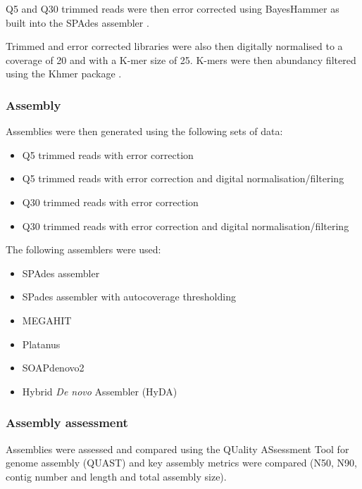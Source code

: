 Q5 and Q30 trimmed reads were then error corrected using BayesHammer
\citep{Nikolenko2013} as built into the SPAdes assembler \citep{Bankevich2012}.

Trimmed and error corrected libraries were also then digitally normalised
\citep{Brown2012} to a coverage of 20 and with a K-mer size of 25.
K-mers were then abundancy filtered \citep{Zhang2014,Zhang2015}
using the Khmer package \citep{Crusoe2015}.

\subsubsection{Assembly}

Assemblies were then generated using the following sets
of data:
\begin{itemize}
    \item Q5 trimmed reads with error correction
    \item Q5 trimmed reads with error correction and digital normalisation/filtering
    \item Q30 trimmed reads with error correction
    \item Q30 trimmed reads with error correction and digital normalisation/filtering
\end{itemize}

The following assemblers were used:
\begin{itemize}
    \item SPAdes assembler \citep{Bankevich2012,Nurk2013}
    \item SPades assembler with autocoverage thresholding 
    \item MEGAHIT \citep{Li2015a}
    \item Platanus \citep{Kajitani2014}
    \item SOAPdenovo2 \citep{Luo2012}
    \item Hybrid \textit{De novo} Assembler (HyDA) \citep{Movahedi2014}
\end{itemize}

\subsubsection{Assembly assessment}

Assemblies were assessed and compared using the
QUality ASsessment Tool for genome assembly (QUAST) \citep{Gurevich2013a}
and key assembly metrics were compared (N50, N90, contig number
and length and total assembly size).




